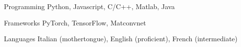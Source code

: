 

\begin{cvskills}

  \cvskill
    {Programming} %
    {Python, Javascript, C/C++, Matlab, Java} %

  \cvskill
    {Frameworks} %
    {PyTorch, TensorFlow, Matconvnet} %

  \cvskill
    {Languages} %
    {Italian (mothertongue), English (proficient), French (intermediate)} %

\end{cvskills}
